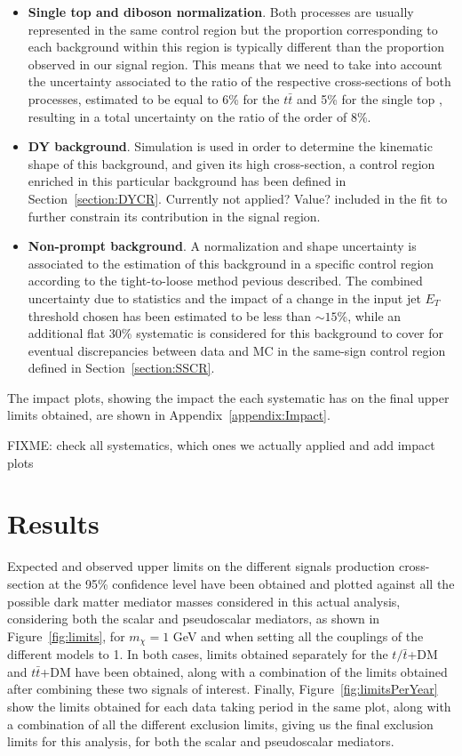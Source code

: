 \documentclass[a4paper, 10pt, openright]{report}
\begin{document}
\begin{itemize}
\item \textbf{Single top and diboson normalization}. Both processes are usually represented in the same control region but the proportion corresponding to each background within this region is typically different than the proportion observed in our signal region. This means that we need to take into account the uncertainty associated to the ratio of the respective cross-sections of both processes, estimated to be equal to 6\% for the $t \bar t$ \cite{ttbarXS} and 5\% for the single top \cite{singletopXS}, resulting in a total uncertainty on the ratio of the order of 8\%.
\item \textbf{\acf{DY} background}. Simulation is used in order to determine the kinematic shape of this background, and given its high cross-section, a control region enriched in this particular background has been defined in Section~\ref{section:DYCR}. \color{red} Currently not applied? Value? \color{black}
included in the fit to further constrain its contribution in the signal region.
\item \textbf{Non-prompt background}. A normalization and shape uncertainty is associated to the estimation of this background in a specific control region according to the tight-to-loose method pevious described. The combined uncertainty due to statistics and the impact of a change in the input jet $E_T$ threshold chosen has been estimated to be less than $\sim15$\%, while an additional flat 30\% systematic is considered for this background to cover for eventual discrepancies between data and \ac{MC} in the same-sign control region defined in Section~\ref{section:SSCR}.
\end{itemize}

The impact plots, showing the impact the each systematic has on the final upper limits obtained, are shown in Appendix~\ref{appendix:Impact}.

\color{red} FIXME: check all systematics, which ones we actually applied and add impact plots \color{black}

\section{Results} \label{section:Results}

Expected and observed upper limits on the different signals production cross-section at the 95\% confidence level have been obtained and plotted against all the possible dark matter mediator masses considered in this actual analysis, considering both the scalar and pseudoscalar mediators, as shown in Figure~\ref{fig:limits}, for $m_\chi = 1$ GeV and when setting all the couplings of the different models to 1. In both cases, limits obtained separately for the $t/\bar t$+DM and $t \bar t$+DM have been obtained, along with a combination of the limits obtained after combining these two signals of interest. Finally, Figure~\ref{fig:limitsPerYear} show the limits obtained for each data taking period in the same plot, along with a combination of all the different exclusion limits, giving us the final exclusion limits for this analysis, for both the scalar and pseudoscalar mediators.
\end{document}
